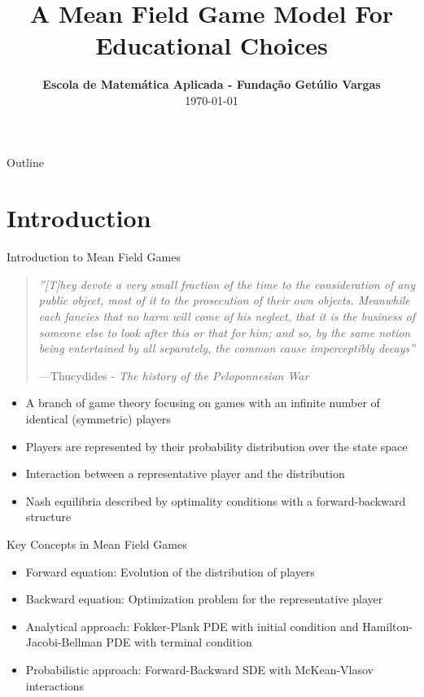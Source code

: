\documentclass[xcolor=dvipsnames,t,aspectratio=170]{beamer} %
\title[A Mean Field Game Model For Educational Choices]{A Mean Field Game Model For Educational Choices}
\author{
    \newauthor{Felipe Antunes}{felipe.antunes@fgv.br}
}
\date{{\color{fgv_dark_blue} \textbf{Escola de Matemática Aplicada - Fundação Getúlio Vargas}\\ \today}}
\begin{document}
\begin{frame}[plain]
\titlepage
\end{frame}

\setcounter{framenumber}{0}

\begin{frame}{Outline}
\tableofcontents
\end{frame}

\section{Introduction}

\begin{frame}{Introduction to Mean Field Games}
\begin{quote}
\itshape ''[T]hey devote a very small fraction of the time to the consideration of any public object, most of it to the prosecution of their own objects. Meanwhile each fancies that no harm will come of his neglect, that it is the business of someone else to look after this or that for him; and so, by the same notion being entertained by all separately, the common cause imperceptibly decays''

\normalfont ---Thucydides - \textit{The history of the Peloponnesian War}
\end{quote}

\begin{itemize}
    \item A branch of game theory focusing on games with an infinite number of identical (symmetric) players
    \item Players are represented by their probability distribution over the state space
    \item Interaction between a representative player and the distribution
    \item Nash equilibria described by optimality conditions with a forward-backward structure
\end{itemize}
\end{frame}

\begin{frame}{Key Concepts in Mean Field Games}
\begin{itemize}
    \item Forward equation: Evolution of the distribution of players
    \item Backward equation: Optimization problem for the representative player
    \item Analytical approach: Fokker-Plank PDE with initial condition and Hamilton-Jacobi-Bellman PDE with terminal condition
    \item Probabilistic approach: Forward-Backward SDE with McKean-Vlasov interactions
\end{itemize}
\end{frame}
\end{document}
